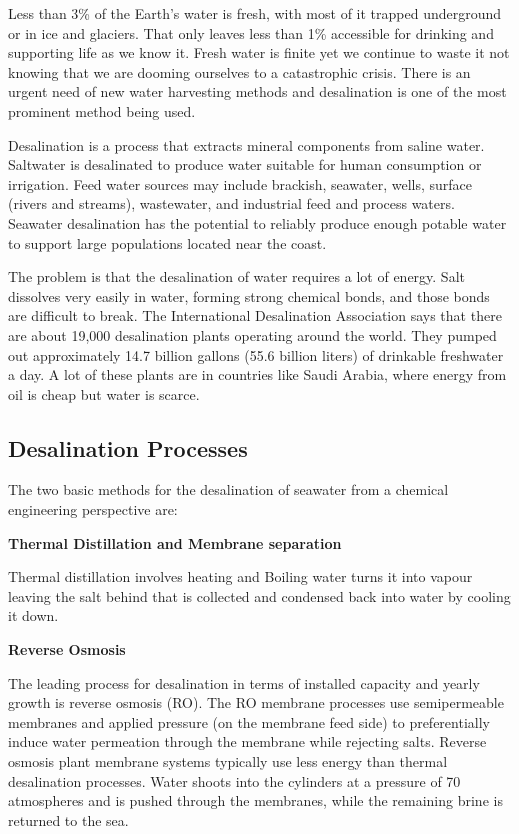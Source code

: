 \documentclass[11pt]{article} %
\begin{document}
\begin{multicols}{2} %
Less than 3\% of the Earth's water is fresh, with most of it trapped underground or 
in ice and glaciers. That only leaves less than 1\% accessible for drinking and 
supporting life as we know it. Fresh water is finite yet we continue to waste it not 
knowing that we are dooming ourselves to a catastrophic crisis. There is an urgent 
need of new water harvesting methods and desalination is one of the most 
prominent method being used.

Desalination is a process that extracts mineral components from saline 
water. Saltwater is desalinated to produce water suitable for human 
consumption or irrigation. Feed water sources may include brackish, seawater, 
wells, surface (rivers and streams), wastewater, and industrial feed and process 
waters. Seawater desalination has the potential to reliably produce enough potable 
water to support large populations located near the coast.

The problem is that the desalination of water requires a lot of energy. Salt dissolves 
very easily in water, forming strong chemical bonds, and those bonds are difficult 
to break. The International Desalination Association says that there are about 
19,000 desalination plants operating around the world. They pumped out 
approximately 14.7 billion gallons (55.6 billion liters) of drinkable freshwater a 
day. A lot of these plants are in countries like Saudi Arabia, where energy from oil 
is cheap but water is scarce.

\subsection*{Desalination Processes}
The two basic methods for the desalination of seawater from a chemical
engineering perspective are:

\begin{description}
\item \textbf{Thermal Distillation and Membrane separation} 
  
  Thermal distillation involves heating and Boiling water turns it into vapour
 leaving the salt behind that is collected and condensed back into water by 
 cooling it down.

 \item \textbf{Reverse Osmosis}

   The leading process for desalination in terms of installed capacity and yearly 
growth is reverse osmosis (RO). The RO membrane processes use semipermeable 
membranes and applied pressure (on the membrane feed side) to preferentially 
induce water permeation through the membrane while rejecting salts. Reverse 
osmosis plant membrane systems typically use less energy than thermal 
desalination processes. Water shoots into the cylinders at a pressure of 70 
atmospheres and is pushed through the membranes, while the remaining brine is 
returned to the sea. 
\end{description}


\end{multicols}
\end{document}
